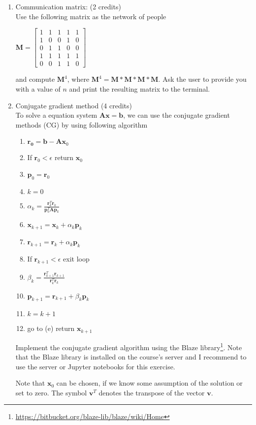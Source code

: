 \documentclass[11pt]{article}
\begin{document}
\begin{enumerate}

\item Communication matrix: (2 credits)\\
Use the following matrix as the network of people
\begin{center}
$
\mathbf{M} = \left[\begin{matrix}
1 & 1 & 1 & 1 & 1 \\
1 & 0 & 0 & 1 & 0 \\
0 & 1 & 1 & 0 & 0 \\
1 & 1 & 1 & 1 & 1 \\
0 & 0 & 1 & 1 & 0
\end{matrix}\right]
$
\end{center}
and compute $\mathbf{M}^4$, where $\mathbf{M}^4= \mathbf{M}*\mathbf{M}*\mathbf{M}*\mathbf{M}$. Ask the user to provide you with a value of $n$ and print the resulting matrix to the terminal.

\item Conjugate gradient method (4 credits)\\
To solve a equation system $\mathbf{A}\mathbf{x}=\mathbf{b}$, we can use the conjugate gradient methods (CG) by using following algorithm
\begin{enumerate}
\item $\mathbf{r_0} = \mathbf{b} - \mathbf{A} \mathbf{x}_0$
\item If $\mathbf{r}_0< \epsilon$ return  $\mathbf{x}_0$
\item $\mathbf{p}_0=\mathbf{r}_0$
\item $k=0$
\item $\alpha_k = \frac{\mathbf{r}_k^T\mathbf{r}_k}{\mathbf{p}_0^T\mathbf{A}\mathbf{p}_k}$
\item $ \mathbf{x}_{k+1} = \mathbf{x}_k + \alpha_k \mathbf{p}_k$
\item $ \mathbf{r}_{k+1} = \mathbf{r}_k + \alpha_k \mathbf{p}_k$
\item If $\mathbf{r}_{k+1}< \epsilon$ exit loop
\item $\beta_k = \frac{\mathbf{r}_{k+1}^T\mathbf{r}_{k+1}}{\mathbf{r}_k^T\mathbf{r}_k}$
\item $\mathbf{p}_{k+1}=\mathbf{r}_{k+1} + \beta_k \mathbf{p}_k$
\item $k=k+1$
\item go to (e)
return $\mathbf{x}_{k+1}$
\end{enumerate}
Implement the conjugate gradient algorithm using the Blaze library\footnote{\url{https://bitbucket.org/blaze-lib/blaze/wiki/Home}}. Note that the Blaze library is installed on the course's server and I recommend to use the server or Jupyter notebooks for this exercise.

Note that $\mathbf{x}_0$ can be chosen, if we know some assumption of the solution or set to zero. The symbol $\mathbf{v}^T$ denotes the transpose of the vector $\mathbf{v}$.

\end{enumerate}
\doclicenseThis 
\end{document}
